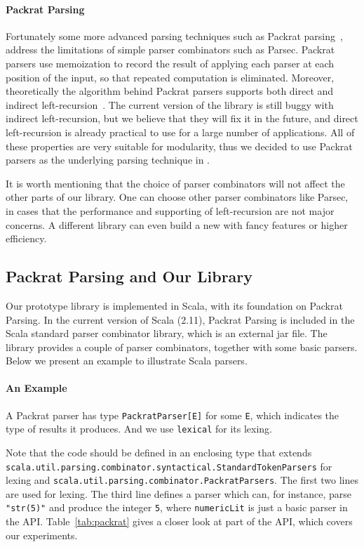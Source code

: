 \paragraph{Packrat Parsing}
Fortunately some more advanced parsing techniques such as Packrat
parsing~\cite{Ford2002}, address the limitations of simple parser combinators
such as Parsec. Packrat parsers use
memoization to record the result of applying each parser at each
position of the input, so that repeated computation is eliminated.
Moreover, theoretically the algorithm behind Packrat parsers
supports both direct and indirect left-recursion~\cite{warth2008}.
The current version of the library is still
buggy with indirect left-recursion, but we believe that
they will fix it in the future, and direct left-recursion is
already practical to use for a large number of applications. All of these properties are very
suitable for modularity, thus we decided to use Packrat parsers as the underlying
parsing technique in \name.


It is worth mentioning that the choice of parser combinators will not
affect the other parts of our library. One can choose other parser
combinators like Parsec, in cases that the performance and supporting
of left-recursion are not major concerns. A different library can even build a new
\name with fancy features or higher efficiency.

\subsection{Packrat Parsing and Our Library \name}\label{subsec:overview-library-api}

Our prototype library is implemented in Scala, with its foundation on Packrat Parsing. In the current version of Scala (2.11), Packrat Parsing is included
in the Scala standard parser combinator library, which is an external jar file. The library provides a couple of
parser combinators, together with some basic parsers. Below we present an example to illustrate Scala parsers.

\paragraph{An Example}
A Packrat parser has type \lstinline{PackratParser[E]} for some
\lstinline{E}, which indicates the type of results it produces.
And we use \lstinline{lexical} for its lexing.

\noindent
Note that the code should be defined in an enclosing type that extends
\lstinline{scala.util.parsing.combinator.syntactical.StandardTokenParsers}
for lexing and
\lstinline{scala.util.parsing.combinator.PackratParsers}.
The first two lines are used for lexing. The third line defines a
parser which can, for instance, parse \lstinline{"str(5)"} and produce
the integer \lstinline{5}, where \lstinline{numericLit} is just a basic parser
in the API. Table~\ref{tab:packrat} gives a closer look at part of the API, which covers our experiments.

